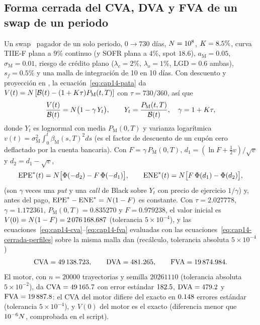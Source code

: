 \subsection{Forma cerrada del CVA, DVA y FVA de un swap de un periodo}\label{sec:cap14-ej-cerrada}

Un swap \MXN\ pagador de un solo periodo, $0\to730$ días, $\Nom=10^{8}$, $\K=8.5\%$, curva TIIE-F plana a $9\%$ continuo
(y SOFR plana a $4\%$, spot $18.6$), $a_{\mathrm M}=0.05$, $\sigma_{\mathrm M}=0.01$, riesgo de crédito plano
($\lambda_c=2\%$, $\lambda_o=1\%$, $\mathrm{LGD}=0.6$ ambas), $s_f=0.5\%$ y una malla de integración de 10 en 10 días. Con
descuento y proyección en \cTIIE, la ecuación~\eqref{eq:cap14-pata} da $V(t)=\Nom\,[\mathcal B(t)-(1+\K\tau)P_{\mathrm M}(t,T)]$
con $\tau=730/360$, así que
\begin{equation}\label{eq:cap14-cerrada}
  \frac{V(t)}{\mathcal B(t)}=\Nom\bigl(1-\gamma\,Y_t\bigr),\qquad Y_t=\frac{P_{\mathrm M}(t,T)}{\mathcal B(t)},\quad \gamma=1+\K\tau,
\end{equation}
donde $Y_t$ es lognormal con media $P_{\mathrm M}(0,T)$ y varianza logarítmica
$v(t)=\sigma_{\mathrm M}^{2}\int_0^{t}\beta_{\mathrm M}(s,T)^{2}ds$ (es el factor de descuento de un cupón cero
deflactado por la cuenta bancaria). Con $F=\gamma\,P_{\mathrm M}(0,T)$, $d_1=(\ln F+\tfrac12 v)/\sqrt v$ y $d_2=d_1-\sqrt v$,
\begin{equation}\label{eq:cap14-cerrada-perfiles}
  \mathrm{EPE}^*(t)=\Nom\bigl[\Ncdf(-d_2)-F\,\Ncdf(-d_1)\bigr],\qquad
  \mathrm{ENE}^*(t)=\Nom\bigl[F\,\Ncdf(d_1)-\Ncdf(d_2)\bigr],
\end{equation}
(son $\gamma$ veces una \emph{put} y una \emph{call} de Black sobre $Y_t$ con precio de ejercicio $1/\gamma$) y, antes del pago, $\mathrm{EPE}^*-\mathrm{ENE}^*=\Nom(1-F)$ es constante. Con $\tau=2.027778$, $\gamma=1.172361$,
$P_{\mathrm M}(0,T)=0.835270$ y $F=0.979238$, el valor inicial es
$V(0)=\Nom(1-F)=\verif{cap14-cf-valor-inicial}{2076168.687}$ (tolerancia $5\times10^{-4}$), y las
ecuaciones~\eqref{eq:cap14-cva}--\eqref{eq:cap14-fva} evaluadas con las ecuaciones~\eqref{eq:cap14-cerrada-perfiles}
sobre la misma malla dan (recálculo, tolerancia absoluta $5\times10^{-4}$)
\[
  \mathrm{CVA}=\verif{cap14-cf-cva}{49138.723},\qquad
  \mathrm{DVA}=\verif{cap14-cf-dva}{481.265},\qquad
  \mathrm{FVA}=\verif{cap14-cf-fva}{19874.984}.
\]
El motor, con $n=20000$ trayectorias y semilla $20261110$ (tolerancia absoluta $5\times10^{-2}$), da
$\mathrm{CVA}=\verif{cap14-cf-motor-cva}{49165.7}$ con error estándar $\verif{cap14-cf-motor-cva-ee}{182.5}$,
$\mathrm{DVA}=\verif{cap14-cf-motor-dva}{479.2}$ y $\mathrm{FVA}=\verif{cap14-cf-motor-fva}{19887.8}$: el CVA del
motor difiere del exacto en $\verif{cap14-cf-motor-z}{0.148}$ errores estándar (tolerancia $5\times10^{-4}$), y
$V(0)$ del motor es el exacto (diferencia menor que $10^{-6}\Nom$, comprobada en el script).

